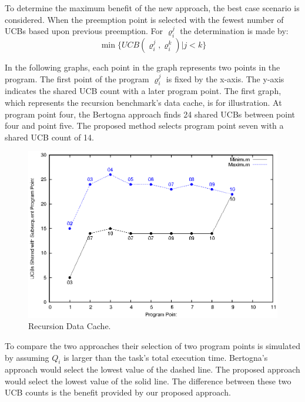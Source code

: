 To determine the maximum benefit of the new approach, the best case
scenario is considered. When the preemption point is selected with the
fewest number of UCBs based upon previous preemption.  For ${\varrho_i^j}$ the
determination is made by:
\begin{equation*}
  \min\{ UCB(\varrho_i^j, \varrho_i^k) \vert j < k \}
\end{equation*}

In the following graphs, each point in the graph represents two points
in the program. The first point of the program ${\varrho_i^j}$ is fixed by the
x-axis. The y-axis indicates the shared UCB count with a later program
point. The first graph, which represents the recursion benchmark's
data cache, is for illustration. At program point four, the Bertogna
approach finds 24 shared UCBs between point four and point five. The
proposed method selects program point seven with a shared UCB count of
14.
%
\begin{figure}[h!]
\vspace{-10pt}
\begin{center}
\includegraphics[width=\linewidth]{eps/recursion-dcache.eps}
\caption{Recursion Data Cache.}
\label{fig:recusion_data_cache}
\end{center}
\vspace{-10pt}
\end{figure}
To compare the two approaches their selection of two program points is
simulated by assuming ${Q_i}$ is larger than the task's total execution
time. Bertogna's approach would select the lowest value of the
dashed line. The proposed approach would select the lowest value of
the solid line. The difference between these two UCB counts is the
benefit provided by our proposed approach.
